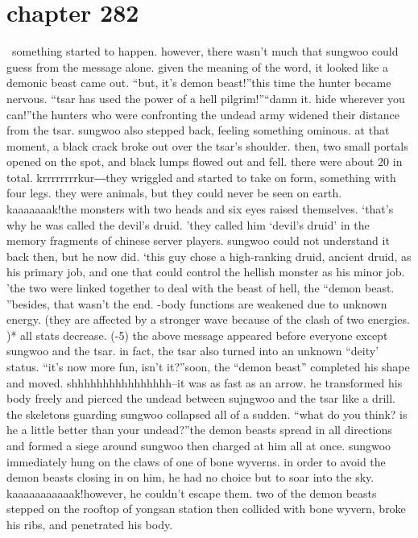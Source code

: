 \section{chapter 282}






 something started to happen.
 however, there wasn’t much that sungwoo could guess from the message alone.
 given the meaning of the word, it looked like a demonic beast came out.
“but, it’s demon beast!”this time the hunter became nervous.
“tsar has used the power of a hell pilgrim!”“damn it.
 hide wherever you can!”the hunters who were confronting the undead army widened their distance from the tsar.
 sungwoo also stepped back, feeling something ominous.
at that moment, a black crack broke out over the tsar’s shoulder.
 then, two small portals opened on the spot, and black lumps flowed out and fell.
 there were about 20 in total.
krrrrrrrrkur―they wriggled and started to take on form, something with four legs.
they were animals, but they could never be seen on earth.
kaaaaaaak!the monsters with two heads and six eyes raised themselves.
‘that’s why he was called the devil’s druid.
’they called him ‘devil’s druid’ in the memory fragments of chinese server players.
sungwoo could not understand it back then, but he now did.
‘this guy chose a high-ranking druid, ancient druid, as his primary job, and one that could control the hellish monster as his minor job.
’the two were linked together to deal with the beast of hell, the “demon beast.
”besides, that wasn’t the end.
-body functions are weakened due to unknown energy.
 (they are affected by a stronger wave because of the clash of two energies.
)* all stats decrease.
 (-5)
the above message appeared before everyone except sungwoo and the tsar.
in fact, the tsar also turned into an unknown “deity’ status.
“it’s now more fun, isn’t it?”soon, the “demon beast” completed his shape and moved.
shhhhhhhhhhhhhhhh–it was as fast as an arrow.
 he transformed his body freely and pierced the undead between sujngwoo and the tsar like a drill.
the skeletons guarding sungwoo collapsed all of a sudden.
“what do you think? is he a little better than your undead?”the demon beasts spread in all directions and formed a siege around sungwoo then charged at him all at once.
sungwoo immediately hung on the claws of one of bone wyverns.
 in order to avoid the demon beasts closing in on him, he had no choice but to soar into the sky.
kaaaaaaaaaaak!however, he couldn’t escape them.
 two of the demon beasts stepped on the rooftop of yongsan station then collided with bone wyvern, broke his ribs, and penetrated his body.
